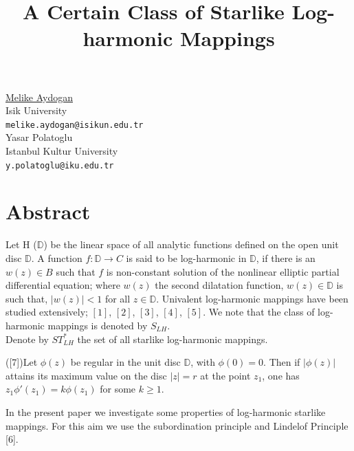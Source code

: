 \documentclass[article, A4, 11pt]{llncs}%
\begin{document}
\title{A Certain Class of Starlike Log-harmonic Mappings}
 \author{} \institute{}
\maketitle
\begin{center}
{\large \underline{Melike Aydogan}}\\
Isik University\\
{\tt melike.aydogan@isikun.edu.tr}
\\ \vspace{4mm}
{\large Yasar Polatoglu}\\
Istanbul Kultur University\\
{\tt y.polatoglu@iku.edu.tr}
\end{center}

\section*{Abstract}
\newcommand{\de}{\mathbb{D}}
Let H ($\de$) be the linear space of all analytic functions defined on the open unit  disc $\de$. 
A function $f: \de \rightarrow C$ is said to be log-harmonic in $\de$, if there is an $w(z)\in B$ such that $f$ is non-constant solution of the nonlinear elliptic partial differential equation; where $w(z)$ the second dilatation function, $w(z)\in \de$ is such that, $\left|w(z)\right|<1$ for all $z\in \de$. Univalent log-harmonic mappings have been studied extensively;  $[1]$, $[2]$, $[3]$, $[4]$, $[5]$. We note that the class of log-harmonic mappings is denoted by $S_{LH}$.\\
Denote by $ST^*_{LH}$ the set of all starlike log-harmonic mappings.
\begin{lemma}([7])Let $\phi(z)$ be regular in the unit disc $\de$, with $\phi(0)=0$. Then if $\left|\phi(z)\right|$ attains its maximum value on the disc $\left|z\right|=r$ at the point $z_{1}$, one has $z_{1}\phi'(z_{1})=k\phi(z_{1})$ for some $k\geq 1$.
\end{lemma}
In the present paper we investigate some properties of log-harmonic starlike mappings. For this aim we use the subordination principle and Lindelof Principle [6].
\end{document}
